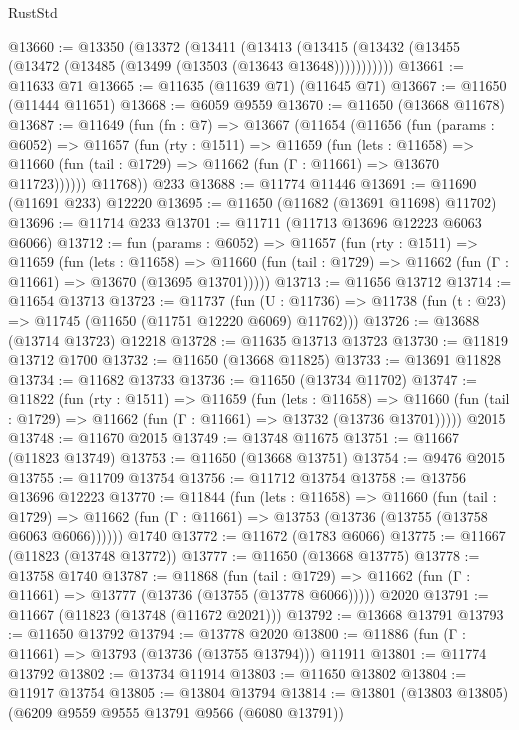 \begin{lexlean}{RustStd}
\begin{coremodule}
@13660 := @13350
    (@13372
      (@13411
        (@13413 (@13415 (@13432 (@13455 (@13472 (@13485 (@13499 (@13503 (@13643 @13648)))))))))))
@13661 := @11633 @71
@13665 := @11635 (@11639 @71) (@11645 @71)
@13667 := @11650 (@11444 @11651)
@13668 := @6059 @9559
@13670 := @11650 (@13668 @11678)
@13687 := @11649
    (fun (fn : @7) =>
    @13667
      (@11654
        (@11656
          (fun (params : @6052) =>
          @11657
            (fun (rty : @1511) =>
            @11659
              (fun (lets : @11658) =>
              @11660 (fun (tail : @1729) => @11662 (fun (Γ : @11661) => @13670 @11723))))))
        @11768))
    @233
@13688 := @11774 @11446
@13691 := @11690 (@11691 @233) @12220
@13695 := @11650 (@11682 (@13691 @11698) @11702)
@13696 := @11714 @233
@13701 := @11711 (@11713 @13696 @12223 @6063 @6066)
@13712 := fun (params : @6052) =>
  @11657
    (fun (rty : @1511) =>
    @11659
      (fun (lets : @11658) =>
      @11660 (fun (tail : @1729) => @11662 (fun (Γ : @11661) => @13670 (@13695 @13701)))))
@13713 := @11656 @13712
@13714 := @11654 @13713
@13723 := @11737
    (fun (U : @11736) => @11738 (fun (t : @23) => @11745 (@11650 (@11751 @12220 @6069) @11762)))
@13726 := @13688 (@13714 @13723) @12218
@13728 := @11635 @13713 @13723
@13730 := @11819 @13712 @1700
@13732 := @11650 (@13668 @11825)
@13733 := @13691 @11828
@13734 := @11682 @13733
@13736 := @11650 (@13734 @11702)
@13747 := @11822
    (fun (rty : @1511) =>
    @11659
      (fun (lets : @11658) =>
      @11660 (fun (tail : @1729) => @11662 (fun (Γ : @11661) => @13732 (@13736 @13701)))))
    @2015
@13748 := @11670 @2015
@13749 := @13748 @11675
@13751 := @11667 (@11823 @13749)
@13753 := @11650 (@13668 @13751)
@13754 := @9476 @2015
@13755 := @11709 @13754
@13756 := @11712 @13754
@13758 := @13756 @13696 @12223
@13770 := @11844
    (fun (lets : @11658) =>
    @11660
      (fun (tail : @1729) =>
      @11662 (fun (Γ : @11661) => @13753 (@13736 (@13755 (@13758 @6063 @6066))))))
    @1740
@13772 := @11672 (@1783 @6066)
@13775 := @11667 (@11823 (@13748 @13772))
@13777 := @11650 (@13668 @13775)
@13778 := @13758 @1740
@13787 := @11868
    (fun (tail : @1729) => @11662 (fun (Γ : @11661) => @13777 (@13736 (@13755 (@13778 @6066)))))
    @2020
@13791 := @11667 (@11823 (@13748 (@11672 @2021)))
@13792 := @13668 @13791
@13793 := @11650 @13792
@13794 := @13778 @2020
@13800 := @11886 (fun (Γ : @11661) => @13793 (@13736 (@13755 @13794))) @11911
@13801 := @11774 @13792
@13802 := @13734 @11914
@13803 := @11650 @13802
@13804 := @11917 @13754
@13805 := @13804 @13794
@13814 := @13801 (@13803 @13805) (@6209 @9559 @9555 @13791 @9566 (@6080 @13791))

\end{coremodule}
\end{lexlean}
